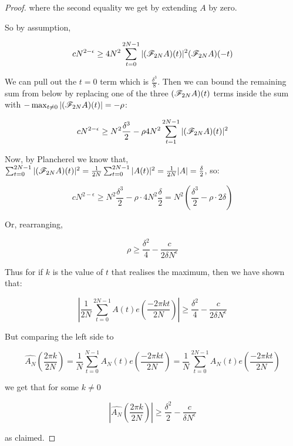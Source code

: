 \documentclass{article}
\theoremstyle{definition}
\theoremstyle{remark}
\numberwithin{equation}{section}
\begin{document}
\begin{proof}
  where the second equality we get by extending $A$ by zero.  
  
  So by assumption, 

  \[cN^{2-\epsilon} \geq 4 N^2 \sum_{t=0}^{2N-1} |(\mathscr{F}_{2N}A)(t)|^2(\mathscr{F}_{2N}A)(-t)\]

  We can pull out the $t = 0$ term which is $\frac{\delta^3}{8}$.  Then we can
  bound the remaining sum from below by replacing one of the three
  $(\mathscr{F}_{2N} A)(t)$ terms inside the sum with
  $-\max_{t\neq 0} |(\mathscr{F}_{2N} A)(t)| = -\rho$:
  
  \[cN^{2-\epsilon} \geq N^2 \frac{\delta^3}{2} - \rho 4 N^2 \sum_{t=1}^{2N-1} |(\mathscr{F}_{2N} A)(t)|^2\]

  Now, by Plancherel we know that,
  $\sum_{t=0}^{2N-1} |(\mathscr{F}_{2N}A)(t)|^2 = \frac{1}{2N}
  \sum_{t=0}^{2N-1} |A(t)|^2 = \frac{1}{2N} |A| = \frac{\delta}{2}$,
  so:

  \[cN^{2-\epsilon} \geq N^2 \frac{\delta^3}{2} - \rho \cdot 4N^2
    \frac{\delta}{2} = N^2\left(\frac{\delta^3}{2} - \rho\cdot 2
      \delta \right)\]

  Or, rearranging, 

  \[\rho \geq \frac{\delta^2}{4} - \frac{c}{2\delta N^\epsilon}\]

  Thus for if $k$ is the value of $t$ that realises the maximum, then we
  have shown that: 
  
  \[\left|\frac{1}{2N} \sum_{t=0}^{2N-1} A(t) e(\frac{-2\pi k
        t}{2N})\right| \geq \frac{\delta^2}{4} - \frac{c}{2\delta N^\epsilon}\]
  
  But comparing the left side to 
  
  \[\widehat{A_N}(\frac{2\pi k}{2N}) = \frac{1}{N}\sum_{t=0}^{N-1} A_N(t) e(\frac{-2\pi k
      t}{2N}) = \frac{1}{N}\sum_{t=0}^{2N-1} A_N(t) e(\frac{-2\pi k
      t}{2N})\]
  
  we get that for some $k \neq 0$

  \[|\widehat{A_N}(\frac{2\pi k}{2N})| \geq \frac{\delta^2}{2} - \frac{c}{\delta
      N^\epsilon}\]

  as claimed.
\end{proof}
\end{document}
